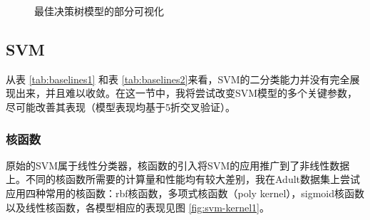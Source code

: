 \documentclass[12pt,a4paper]{article}
\theoremstyle{definition}
\begin{document}
\begin{figure}[H]
	\centering
	\caption{最佳决策树模型的部分可视化}
	\label{fig:dt-best-vis}
\end{figure}

\subsection{SVM}

从表 \ref{tab:baselines1} 和表 \ref{tab:baselines2}来看，SVM的二分类能力并没有完全展现出来，并且难以收敛。在这一节中，我将尝试改变SVM模型的多个关键参数，尽可能改善其表现（模型表现均基于5折交叉验证）。

\subsubsection{核函数}

原始的SVM属于线性分类器，核函数的引入将SVM的应用推广到了非线性数据上。不同的核函数所需要的计算量和性能均有较大差别，我在Adult数据集上尝试应用四种常用的核函数：rbf核函数，多项式核函数（poly kernel），sigmoid核函数以及线性核函数，各模型相应的表现见图 \ref{fig:svm-kernel1}。
\end{document}

